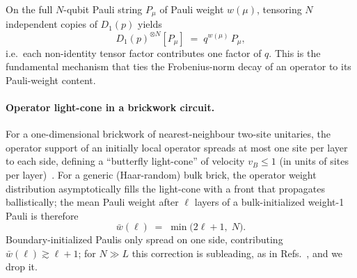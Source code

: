 \documentclass[%
 reprint,
superscriptaddress,
 amsmath,amssymb,
 aps,
]{revtex4-2}
\begin{document}
On the full $N$-qubit Pauli string $P_\mu$ of Pauli weight $w(\mu)$, tensoring $N$ independent copies of $D_1(p)$ yields
\begin{equation}
    D_1(p)^{\otimes N}[P_\mu] \;=\; q^{w(\mu)}\,P_\mu,
    \label{eq:D1_on_Pauli}
\end{equation}
i.e.\ each non-identity tensor factor contributes one factor of $q$. This is the fundamental mechanism that ties the Frobenius-norm decay of an operator to its Pauli-weight content.

\paragraph*{Operator light-cone in a brickwork circuit.}
For a one-dimensional brickwork of nearest-neighbour two-site unitaries, the operator support of an initially local operator spreads at most one site per layer to each side, defining a ``butterfly light-cone'' of velocity $v_B\le 1$ (in units of sites per layer)~\cite{nahum2018operator,vonKeyserlingk2018operatorhydrodynamics,chen2018operator}. For a generic (Haar-random) bulk brick, the operator weight distribution asymptotically fills the light-cone with a front that propagates ballistically; the mean Pauli weight after $\ell$ layers of a bulk-initialized weight-1 Pauli is therefore
\begin{equation}
    \bar w(\ell) \;=\; \min\!\bigl(2\ell+1,\;N\bigr).
    \label{eq:mean_weight_lightcone}
\end{equation}
Boundary-initialized Paulis only spread on one side, contributing $\bar w(\ell)\gtrsim \ell+1$; for $N\gg L$ this correction is subleading, as in Refs.~\cite{nahum2018operator,vonKeyserlingk2018operatorhydrodynamics}, and we drop it.
\end{document}
